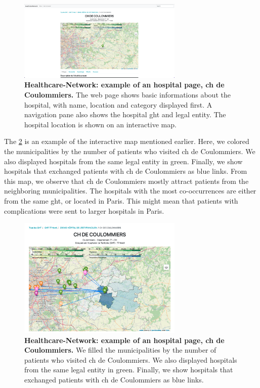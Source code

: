 \begin{figure}[h]
    \includegraphics[width=0.7\textwidth]{images/healthcare-network/hospital-page.png}
    \centering
    \caption{ \textbf{Healthcare-Network: example of an hospital page, \acf{ch}
            de Coulommiers.} The web page shows basic informations about the
        hospital, with name, location and category displayed first. A navigation
        pane also shows the hospital \ac{ght} and legal entity. The hospital
        location is shown on an interactive map. }
    \label{fig:hn-coulommiers-page}
\end{figure}

The \cref{fig:hn-coulommiers-co-occ} is an example of the interactive map
mentioned earlier. Here, we colored the municipalities by the number of patients
who visited \ac{ch} de Coulommiers. We also displayed hospitals from the same
legal entity in green. Finally, we show hospitals that exchanged patients with
\ac{ch} de Coulommiers as blue links. From this map, we observe that \ac{ch} de
Coulommiers mostly attract patients from the neighboring municipalities. The
hospitals with the most co-occurrences are either from the same \ac{ght}, or
located in Paris. This might mean that patients with complications were sent to
larger hospitals in Paris.

\begin{figure}[h]
    \includegraphics[width=0.7\textwidth]{images/healthcare-network/coulommiers-co-occ.png}
    \centering
    \caption{ \textbf{Healthcare-Network: example of an hospital page, \acf{ch}
            de Coulommiers.} We filled the municipalities by the number of patients
        who visited \ac{ch} de Coulommiers. We also displayed hospitals from the
        same legal entity in green. Finally, we show hospitals that exchanged
        patients with \ac{ch} de Coulommiers as blue links. }
    \label{fig:hn-coulommiers-co-occ}
\end{figure}

